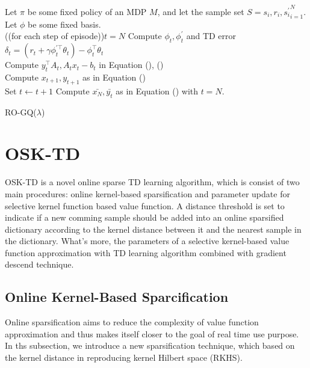 \documentclass[conference]{IEEEtran}
\makeatletter
\newcommand{\removelatexerror}{\let\@latex@error\@gobble}
\newcommand{\dosemic}{\renewcommand{\@endalgocfline}{\algocf@endline}}%
\newcommand{\pushline}{\Indp}%
\let\oldnl\nl%
\newcommand{\nonl}{\renewcommand{\nl}{\let\nl\oldnl}}%
\makeatother
\begin{document}
{
	\removelatexerror%
	\LinesNumbered
	\begin{algorithm}[H]
		\pushline\dosemic\nonl \textup{Let $\pi$ be some fixed policy of an MDP $M$, and let the sample set $S={s_i, r_i, s_i^{'}}_{i=1}^N$. Let $\phi$ be some fixed basis.}\\

		\Repeat({(for each step of episode)}){$t=N$}{
	  		\textup{Compute $\phi_t, \phi_t^{'}$ and TD error $\delta_t=(r_t+\gamma\phi_t^{'\top}\theta_t)-\phi_t^\top\theta_t$}\\
	  		\textup{Compute $y_t^\top A_t, A_tx_t-b_t$ in Equation (), ()}\\
			\textup{Compute $x_{t+1}, y_{t+1}$ as in Equation ()}\\
			\textup{Set $t\leftarrow t+1$}
  		}
  		\textup{Compute $\bar{x_N}, \bar{y_t}$ as in Equation () with $t=N$}.
 		\caption{RO-GQ($\lambda$)}
	\end{algorithm}
}
\newpage
\section{OSK-TD}
OSK-TD is a novel online sparse TD learning algorithm, which is consist of two main procedures: online kernel-based sparsification and parameter update for selective kernel function based value function. A distance threshold is set to indicate if a new comming sample should be added into an online sparsified dictionary according to the kernel distance between it and the nearest sample in the dictionary. What's more, the parameters of a selective kernel-based value function  approximation with TD learning algorithm combined with gradient descend technique. 
\subsection{Online Kernel-Based Sparcification}
Online sparsification aims to reduce the complexity of value function approximation and thus makes itself closer to the goal of real time use purpose. In ths subsection, we introduce a new sparsification technique, which based on the kernel distance in reproducing kernel Hilbert space (RKHS).\\
\end{document}
